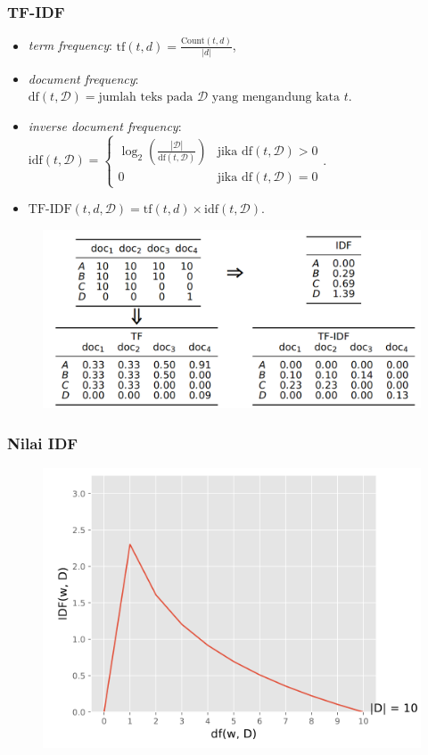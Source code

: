 \documentclass[10pt]{beamer}
\newcommand{\f}[1]{\textit{#1}}
\begin{document}
\begin{frame}
    \frametitle{TF-IDF}
    \begin{itemize}
        \item \f{term frequency}: $\text{tf}(t, d) = \frac{\text{Count}(t, d)}{|d|}$,
        \item \f {document frequency}: $\text{df}(t, \mathcal{D}) = \text{jumlah teks pada } \mathcal{D} \text{ yang mengandung kata } t$. 
        \item \f{inverse document frequency}: $\text{idf}(t, \mathcal{D}) = \begin{cases}
            \log_2\left(\frac{|\mathcal{D}|}{\text{df}(t, \mathcal{D})}\right) & \text{jika } \text{df}(t, \mathcal{D}) > 0 \\
            0 & \text{jika } \text{df}(t, \mathcal{D}) = 0
        \end{cases}$.
        \item $\text{TF-IDF}(t, d, \mathcal{D}) = \text{tf}(t, d) \times \text{idf}(t, \mathcal{D})$.
    \end{itemize}

    \begin{figure}[!ht]
        \centering
        \includegraphics[width=1\textwidth]{assets/pics/tf-idf-matriks.png}
    \end{figure}
\end{frame}

\begin{frame}
    \frametitle{Nilai IDF}
    \begin{figure}[!ht]
        \centering
        \includegraphics[width=1\textwidth]{assets/pics/idf-graph.png}
        \end{figure}
\end{frame}
\end{document}
